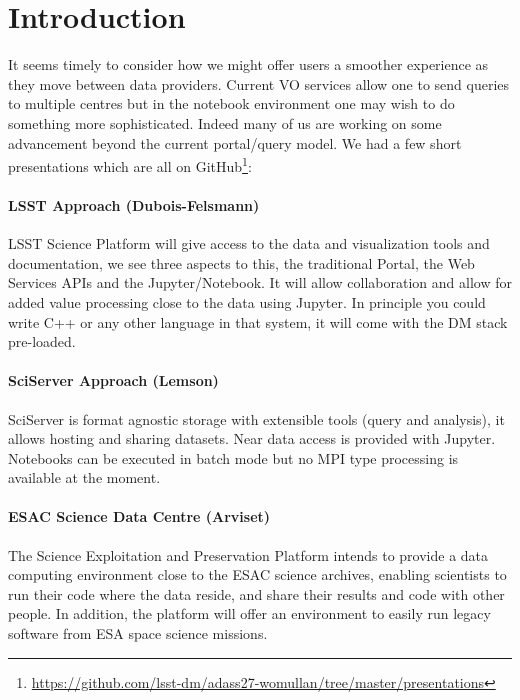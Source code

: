 \documentclass[11pt,twoside]{article}
\begin{document}
\section{Introduction}

It seems timely to consider how we might offer users a smoother experience as they move between data providers.
Current VO services allow one to send queries to multiple centres but in the notebook environment one may wish to do something more sophisticated.
Indeed many of us are working on some advancement beyond the current portal/query model.
We had a few short presentations which are all on GitHub\footnote{\url{https://github.com/lsst-dm/adass27-womullan/tree/master/presentations}}:

\paragraph*{LSST Approach (Dubois-Felsmann)} LSST \citep{2008arXiv0805.2366I} Science Platform \citep{LSE-319} will give access to the data and visualization tools and documentation, we see three aspects to this, the traditional Portal, the Web Services APIs and the Jupyter/Notebook.
It will allow collaboration and allow for added value processing close to the data using Jupyter. In principle you could write C++ or any other language in that system, it will come with the DM stack \citep{O3-1_adassxxv} pre-loaded.

\paragraph*{SciServer Approach (Lemson)} SciServer is format agnostic storage with extensible tools (query and analysis), it allows hosting and sharing datasets. Near data access is provided with Jupyter. Notebooks can be executed in batch mode but no MPI type processing is available at the moment.

\paragraph*{ESAC Science Data Centre (Arviset)} The Science Exploitation and Preservation Platform intends to provide a data computing environment close to the ESAC science archives, enabling scientists to run their code where the data reside, and share their results and code with other people. In addition, the platform will offer an environment to easily run legacy software from ESA space science missions.
\end{document}
